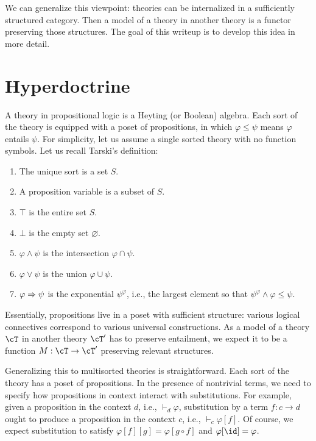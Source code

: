 \documentclass[article,10pt,oneside]{memoir}
\begin{document}
We can generalize this viewpoint: theories can be internalized in a sufficiently structured category.
Then a model of a theory in another theory is a functor preserving those structures.
The goal of this writeup is to develop this idea in more detail.

\section{Hyperdoctrine}
\label{sec:hyperdoctrine}

A theory in propositional logic is a Heyting (or Boolean) algebra.
Each sort of the theory is equipped with a poset of propositions, in which $\varphi \leq \psi$ means $\varphi$ entails $\psi$.
For simplicity, let us assume a single sorted theory with no function symbols.
Let us recall Tarski's definition:
\begin{enumerate}
\item The unique sort is a set $S$.
\item A proposition variable is a subset of $S$.
\item $\top$ is the entire set $S$.
\item $\bot$ is the empty set $\varnothing$.
\item $\varphi \wedge \psi$ is the intersection $\varphi \cap \psi$.
\item $\varphi \vee \psi$ is the union $\varphi \cup \psi$.
\item $\varphi \Rightarrow \psi$ is the exponential $\psi^{\varphi}$, i.e., the largest element so that $\psi^{\varphi} \wedge \varphi \leq \psi$.
\end{enumerate}

Essentially, propositions live in a poset with sufficient structure: various logical connectives correspond to various universal constructions.
As a model of a theory $\cT$ in another theory $\cT'$ has to preserve entailment, we expect it to be a function $M : \cT \to \cT'$ preserving relevant structures.

Generalizing this to multisorted theories is straightforward.
Each sort of the theory has a poset of propositions.
In the presence of nontrivial terms, we need to specify how propositions in context interact with substitutions.
For example, given a proposition in the context $d$, i.e., $\vdash_{d} \varphi$, substitution by a term $f : c \to d$ ought to produce a proposition in the context $c$, i.e., $\vdash_{c} \varphi[f]$.
Of course, we expect substitution to satisfy $\varphi[f][g] = \varphi[g \circ f]$ and $\varphi[\id] = \varphi$.
\end{document}
